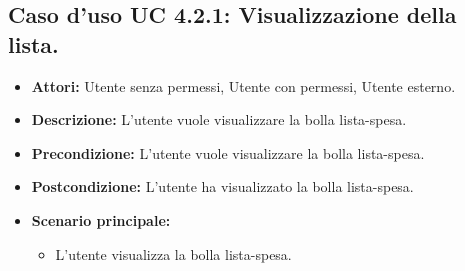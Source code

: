 \subsection{Caso d'uso UC 4.2.1: Visualizzazione della lista.}
\label{Caso d'uso UC 4.2.1: Visualizzazione della lista.}

\FloatBarrier
\begin{itemize}
\item \textbf{Attori:} Utente senza permessi, Utente con permessi, Utente esterno.
\item \textbf{Descrizione:} L'utente vuole visualizzare la bolla lista-spesa.
\item \textbf{Precondizione:} L'utente vuole visualizzare la bolla lista-spesa. 
\item \textbf{Postcondizione:} L'utente ha visualizzato la bolla lista-spesa.
\item \textbf{Scenario principale:}
	\begin{itemize}
	\item{L'utente visualizza la bolla lista-spesa.}
	\end{itemize}
\end{itemize}